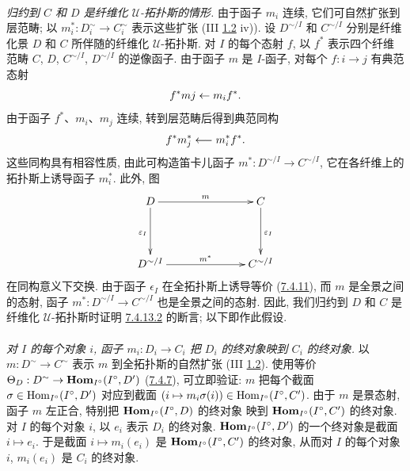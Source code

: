 \paragraph{}
\emph{归约到 $C$ 和 $D$ 是纤维化 $𝒰$-拓扑斯的情形.}
由于函子 $m_i$ 连续, 它们可自然扩张到层范畴;
以 $m_i^{\ast}:D_i^{\sim}\to C_i^{\sim}$ 表示这些扩张
(III \hyperref[III.prop1.2]{1.2} iv)).
设 $D^{\sim/I}$ 和 $C^{\sim/I}$ 分别是纤维化景 $D$ 和 $C$
所伴随的纤维化 $𝒰$-拓扑斯.
对 $I$ 的每个态射 $f$, 以 $f^{\ast}$ 表示四个纤维范畴
$C$, $D$, $C^{\sim/I}$, $D^{\sim/I}$ 的逆像函子.
由于函子 $m$ 是 $I$-函子, 对每个 $f:i\to j$ 有典范态射
$$
f^{\ast} mj \leftarrow m_i f^{\ast}{}.
$$
由于函子 $f^{\ast}$、$m_i$、$m_j$ 连续,
转到层范畴后得到典范同构
$$
f^{\ast} m_j^{\ast} \longleftarrow m_i^{\ast} f^{\ast}{}.
$$
这些同构具有相容性质, 由此可构造笛卡儿函子
$m^{\ast}:D^{\sim/I}\to C^{\sim/I}$,
它在各纤维上的拓扑斯上诱导函子 $m_i^{\ast}$.
此外, 图
\[
\xymatrix@C=2.5cm@R=1.5cm{
D \ar[r]^{m} \ar[d]_{\varepsilon_I}& C \ar[d]^{\varepsilon_I}\\
D^{\sim/I}   \ar[r]^{m^{\ast}}& C^{\sim/I}
}
\]
在同构意义下交换.
由于函子 $\epsilon_I$ 在全拓扑斯上诱导等价
(\hyperref[VI.cor7.4.11]{7.4.11}),
而 $m$ 是全景之间的态射,
函子 $m^{\ast}:D^{\sim/I}\to C^{\sim/I}$ 也是全景之间的态射.
因此, 我们归约到 $D$ 和 $C$ 是纤维化 $𝒰$-拓扑斯时证明
\hyperref[VI.par7.4.13.2]{7.4.13.2} 的断言; 以下即作此假设.

\paragraph{}
\emph{对 $I$ 的每个\pageoriginale 对象 $i$,
函子 $m_i:D_i\to C_i$ 把 $D_i$ 的终对象映到 $C_i$ 的终对象.}
以 $m:D^{\sim}\to C^{\sim}$ 表示 $m$ 到全拓扑斯的自然扩张
(III \hyperref[III.prop1.2]{1.2}).
使用等价 $\Theta_D:D^{\sim}\to\Hhom_{I^{\circ}}(I^{\circ},D')$
(\hyperref[VI.prop7.4.7]{7.4.7}), 可立即验证:
$m$ 把每个截面 $\sigma\in\operatorname{Hom}_{I^{\circ}}({I^{\circ}},D')$
对应到截面 $(i\mapsto m_i\sigma(i))\in\operatorname{Hom}_{I^{\circ}}({I^{\circ}},C')$.
由于 $m$ 是景态射, 函子 $m$ 左正合,
特别把 $\operatorname{\mathbf{Hom}}_{I^{\circ}}({I^{\circ}},D)$ 的终对象
映到 $\operatorname{\mathbf{Hom}}_{I^{\circ}}({I^{\circ}},C')$ 的终对象.
对 $I$ 的每个对象 $i$, 以 $e_i$ 表示 $D_i$ 的终对象.
$\operatorname{\mathbf{Hom}}_{I^{\circ}}({I^{\circ}},D')$ 的一个终对象是截面 $i\mapsto e_i$.
于是截面 $i\mapsto m_i(e_i)$ 是
$\operatorname{\mathbf{Hom}}_{I^{\circ}}({I^{\circ}},C')$ 的终对象,
从而对 $I$ 的每个对象 $i$, $m_i(e_i)$ 是 $C_i$ 的终对象.

